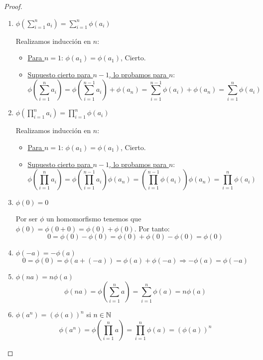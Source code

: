 \begin{proof} \
\begin{enumerate}
    \item $\phi\left( \sum\limits_{i=1}^n a_i \right) = \sum\limits_{i=1}^{n} \phi(a_i)$

    Realizamos inducción en $n$:
    \begin{itemize}
        \item \underline{Para $n=1$}: $\phi(a_1) = \phi(a_1)$, Cierto.
        \item \underline{Supuesto cierto para $n-1$, lo probamos para $n$}:
        $$\phi\left( \sum\limits_{i=1}^n a_i \right)
        = \phi\left( \sum\limits_{i=1}^{n-1} a_i \right) + \phi(a_n)
        = \sum_{i=1}^{n-1} \phi(a_i) + \phi(a_n)
        = \sum\limits_{i=1}^{n} \phi(a_i)$$
    \end{itemize}
    
    \item $\phi\left( \prod\limits_{i=1}^n a_i \right) = \prod\limits_{i=1}^n \phi(a_i)$

    Realizamos inducción en $n$:
    \begin{itemize}
        \item \underline{Para $n=1$}: $\phi(a_1) = \phi(a_1)$, Cierto.
        \item \underline{Supuesto cierto para $n-1$, lo probamos para $n$}:
        $$\phi\left( \prod\limits_{i=1}^n a_i \right) = \phi\left( \prod\limits_{i=1}^{n-1} a_i \right)  \phi(a_n) =
        \left( \prod_{i=1}^{n-1} \phi(a_i) \right) \phi(a_n) = \prod\limits_{i=1}^{n} \phi(a_i)$$
    \end{itemize}
    
    \item $\phi(0)=0$

    Por ser $\phi$ un homomorfismo tenemos que $\phi(0) = \phi(0+0) = \phi(0) + \phi(0)$. Por tanto:
    $$0 = \phi(0) - \phi(0) = \phi(0) + \phi(0) - \phi(0) = \phi(0)$$
    
    \item $\phi(-a) = -\phi(a)$
    $$0 = \phi(0) = \phi(a+(-a)) = \phi(a) + \phi(-a) \Longrightarrow -\phi(a) = \phi(-a)$$
    
    \item $\phi(na) = n\phi(a)$
    $$\phi(na) = \phi\left( \sum_{i=1}^n a \right) = \sum_{i=1}^n \phi(a) = n\phi(a)$$
    
    \item $\phi(a^n) = (\phi(a))^n$ si $n \in \mathbb N$
    $$\phi(a^n) = \phi\left( \prod_{i=1}^n a \right) = \prod_{i=1}^n \phi(a) = (\phi(a))^n$$
    

\end{enumerate}
\end{proof}
